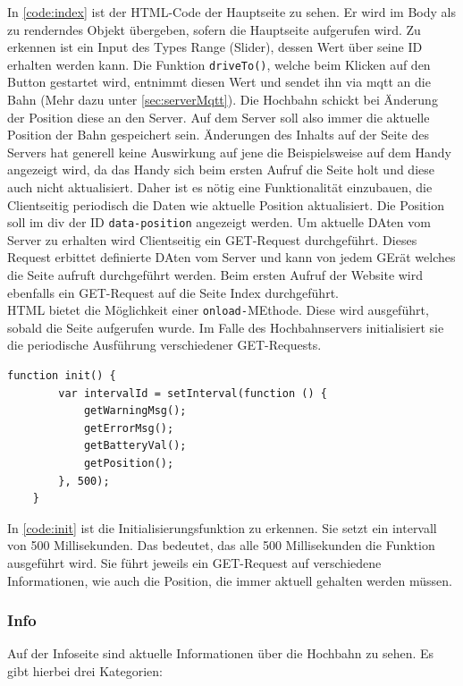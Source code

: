 In \autoref{code:index} ist der HTML-Code der Hauptseite zu sehen. Er wird im Body als zu renderndes Objekt übergeben, sofern die Hauptseite aufgerufen wird. Zu erkennen ist ein Input des Types Range (Slider), dessen Wert über seine ID erhalten werden kann. Die Funktion \texttt{driveTo()}, welche beim Klicken auf den Button gestartet wird, entnimmt diesen Wert und sendet ihn via \acrshort{mqtt} an die Bahn (Mehr dazu unter \autoref{sec:serverMqtt}). Die Hochbahn schickt bei Änderung der Position diese an den Server. Auf dem Server soll also immer die aktuelle Position der Bahn gespeichert sein. Änderungen des Inhalts auf der Seite des Servers hat generell keine Auswirkung auf jene die Beispielsweise auf dem Handy angezeigt wird, da das Handy sich beim ersten Aufruf die Seite holt und diese auch nicht aktualisiert. Daher ist es nötig eine Funktionalität einzubauen, die Clientseitig periodisch die Daten wie aktuelle Position aktualisiert. Die Position soll im div der ID \texttt{data-position} angezeigt werden. Um aktuelle DAten vom Server zu erhalten wird Clientseitig ein GET-Request durchgeführt. Dieses Request erbittet definierte DAten vom Server und kann von jedem GErät welches die Seite aufruft durchgeführt werden. Beim ersten Aufruf der Website wird ebenfalls ein GET-Request auf die Seite Index durchgeführt. \\
HTML bietet die Möglichkeit einer \texttt{onload-}MEthode. Diese wird ausgeführt, sobald die Seite aufgerufen wurde. Im Falle des Hochbahnservers initialisiert sie die periodische Ausführung verschiedener GET-Requests. 

\begin{lstlisting}[language=html, style=dhpaperdefault]
	function init() {
		var intervalId = setInterval(function () {
			getWarningMsg();
			getErrorMsg();
			getBatteryVal();
			getPosition();
		}, 500);
	}
\end{lstlisting}
\vspace{1cm}
In \autoref{code:init} ist die Initialisierungsfunktion zu erkennen. Sie setzt ein intervall von 500 Millisekunden. Das bedeutet, das alle 500 Millisekunden die Funktion ausgeführt wird. Sie führt jeweils ein GET-Request auf verschiedene Informationen, wie auch die Position, die immer aktuell gehalten werden müssen. 

\subsubsection{Info}
Auf der Infoseite sind aktuelle Informationen über die Hochbahn zu sehen. Es gibt hierbei drei Kategorien:

